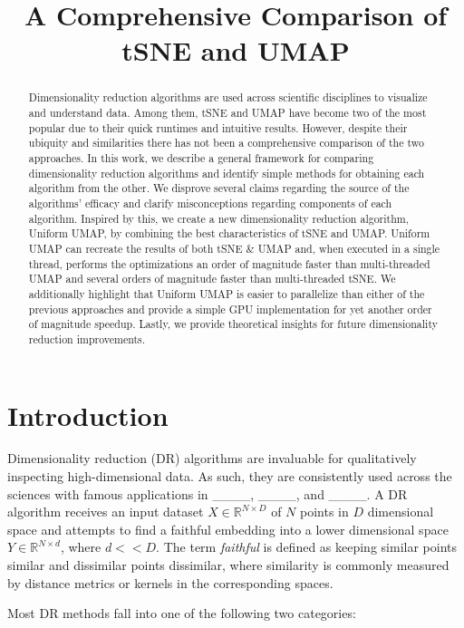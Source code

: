 \documentclass{article}
\title{A Comprehensive Comparison of tSNE and UMAP}
\theoremstyle{definition}
\begin{document}
\maketitle

\begin{abstract}
Dimensionality reduction algorithms are used across scientific disciplines to visualize and understand data. Among them, tSNE and UMAP have become two of the most
popular due to their quick runtimes and intuitive results. However, despite their ubiquity and similarities there
has not been a comprehensive comparison of the two approaches. In this work, we describe a general framework for comparing dimensionality reduction algorithms and
identify simple methods for obtaining each algorithm from the other. We disprove several claims regarding the source of the algorithms' efficacy and clarify
misconceptions regarding components of each algorithm. Inspired by this, we create a new dimensionality reduction algorithm, Uniform UMAP, by combining the best characteristics of tSNE
and UMAP. Uniform UMAP can recreate the results of both tSNE \& UMAP and, when executed in a single thread, performs the optimizations an order of magnitude faster than
multi-threaded UMAP and several orders of magnitude faster than multi-threaded tSNE. We additionally highlight that Uniform UMAP is easier to parallelize than either of the previous approaches and provide
a simple GPU implementation for yet another order of magnitude speedup.
Lastly, we provide theoretical insights for future dimensionality reduction improvements.
\end{abstract}

\section{Introduction}
Dimensionality reduction (DR) algorithms are invaluable for qualitatively inspecting high-dimensional data. As such, they are consistently used across the sciences
with famous applications in \_\_\_\_, \_\_\_\_, and \_\_\_\_. A DR algorithm receives an input dataset $X \in \mathbb{R}^{N \times D}$ of
$N$ points in $D$ dimensional space and
attempts to find a faithful embedding into a lower dimensional space $Y \in \mathbb{R}^{N \times d}$, where $d << D$. The term \textit{faithful} is
defined as keeping similar points similar and dissimilar points dissimilar, where similarity is commonly measured by distance metrics or kernels in the corresponding spaces.

Most DR methods fall into one of the following two categories:
\end{document}
